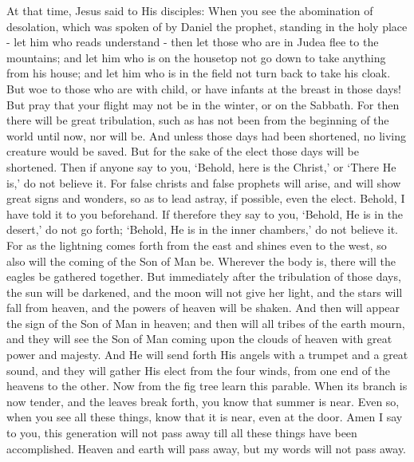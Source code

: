 {{At that time, Jesus said to His disciples: When you see the abomination of desolation, which was spoken of by Daniel the prophet, standing in the holy place - let him who reads understand - then let those who are in Judea flee to the mountains; and let him who is on the housetop not go down to take anything from his house; and let him who is in the field not turn back to take his cloak. But woe to those who are with child, or have infants at the breast in those days! But pray that your flight may not be in the winter, or on the Sabbath. For then there will be great tribulation, such as has not been from the beginning of the world until now, nor will be. And unless those days had been shortened, no living creature would be saved. But for the sake of the elect those days will be shortened. Then if anyone say to you, ‘Behold, here is the Christ,’ or ‘There He is,’ do not believe it. For false christs and false prophets will arise, and will show great signs and wonders, so as to lead astray, if possible, even the elect. Behold, I have told it to you beforehand. If therefore they say to you, ‘Behold, He is in the desert,’ do not go forth; ‘Behold, He is in the inner chambers,’ do not believe it. For as the lightning comes forth from the east and shines even to the west, so also will the coming of the Son of Man be. Wherever the body is, there will the eagles be gathered together. But immediately after the tribulation of those days, the sun will be darkened, and the moon will not give her light, and the stars will fall from heaven, and the powers of heaven will be shaken. And then will appear the sign of the Son of Man in heaven; and then will all tribes of the earth mourn, and they will see the Son of Man coming upon the clouds of heaven with great power and majesty. And He will send forth His angels with a trumpet and a great sound, and they will gather His elect from the four winds, from one end of the heavens to the other. Now from the fig tree learn this parable. When its branch is now tender, and the leaves break forth, you know that summer is near. Even so, when you see all these things, know that it is near, even at the door. Amen I say to you, this generation will not pass away till all these things have been accomplished. Heaven and earth will pass away, but my words will not pass away.
  }
}
\newcommand{\offertory}{%
  De profúndis clamávi ad te, Dómine: Dómine, exáudi oratiónem meam: de profúndis clamávi ad te, Dómine.
}
\newcommand{\offertoryTranslation}{%
  Out of the depths I cry to You, O Lord; Lord, hear my prayer! Out of the depths I cry to You, O Lord.
}
